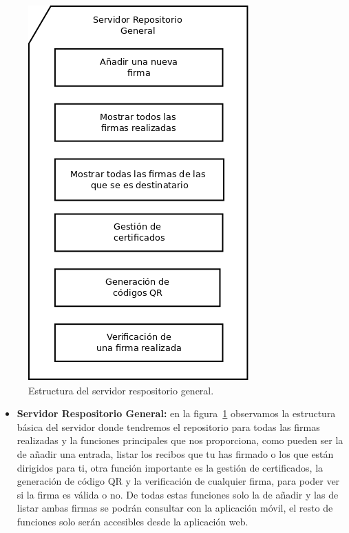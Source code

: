 \begin{figure}
  \centering
    \includegraphics[scale=0.3]{./DisenhoYArquitectura/imagenes/serverRepositorioGeneral.png}
  \caption{Estructura del servidor respositorio general.}
  \label{fig:serverRepositorioGeneral}
\end{figure}

\begin{itemize}
\item \textbf{Servidor Respositorio General:} en la figura~\ref{fig:serverRepositorioGeneral} observamos la estructura básica del servidor donde tendremos el repositorio para todas las firmas realizadas y la funciones principales que nos proporciona, como pueden ser la de añadir una entrada, listar los recibos que tu has firmado o los que están dirigidos para ti, otra función importante es la gestión de certificados, la generación de código QR y la verificación de cualquier firma, para poder ver si la firma es válida o no. De todas estas funciones solo la de añadir y las de listar ambas firmas se podrán consultar con la aplicación móvil, el resto de funciones solo serán accesibles desde la aplicación web.  
\end{itemize}


